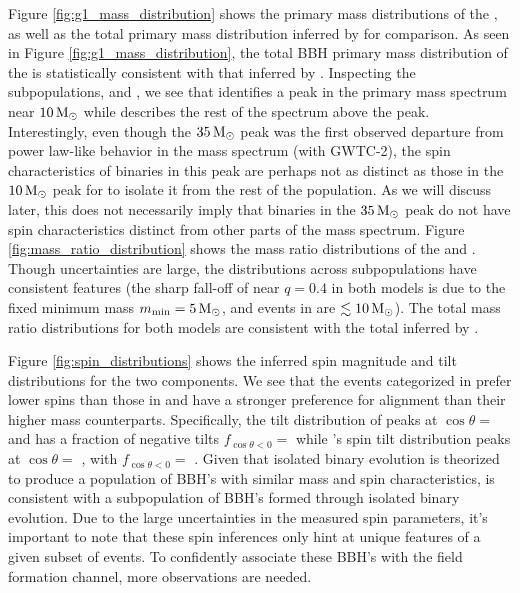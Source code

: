 Figure \ref{fig:g1_mass_distribution} shows the primary mass distributions of the \base{}, as well as the total primary mass distribution inferred by \brucepaper{} for comparison. As seen in Figure \ref{fig:g1_mass_distribution}, the total BBH primary mass distribution of the \base{} is statistically consistent with that inferred by \brucepaper{}. Inspecting the subpopulations, \first{} and \contB{}, we see that \first{} identifies a peak in the primary mass spectrum near $10{\,\rm M}_\odot$ while \contB{} describes the rest of the spectrum above the peak. Interestingly, even though the $35{\,\rm M}_\odot$ peak was the first observed departure from power law-like behavior in the mass spectrum (with GWTC-2), the spin characteristics of binaries in this peak are perhaps not as distinct as those in the $10{\,\rm M}_\odot$ peak for \first{} to isolate it from the rest of the population. As we will discuss later, this does not necessarily imply that binaries in the $35{\,\rm M}_\odot$ peak do not have spin characteristics distinct from other parts of the mass spectrum. Figure \ref{fig:mass_ratio_distribution} shows the mass ratio distributions of the \base{} and \comp{}. Though uncertainties are large, the distributions across subpopulations have consistent features (the sharp fall-off of \first{} near $q=0.4$ in both models is due to the fixed minimum mass $m_\text{min}=5{\,\rm M}_\odot$, and events in \first{} are $\lesssim10{\,\rm M}_\odot$). The total mass ratio distributions for both models are consistent with the total inferred by \brucepaper.

Figure \ref{fig:spin_distributions} shows the inferred spin magnitude and tilt distributions for the two components. We see that the events categorized in \popA{} prefer lower spins than those in \popB{} and have a stronger preference for alignment than their higher mass counterparts. Specifically, the tilt distribution of \popA{} peaks at $\cos{\theta}=$ \result{$\CIPlusMinus{\macros[CosTilt][Base][PeakA][max]}$} and has a fraction of negative tilts $f_{\cos{\theta} < 0} = $ \result{$\CIPlusMinus{\macros[CosTilt][Base][PeakA][negfrac]}$} while \popB{}'s spin tilt distribution peaks at $\cos{\theta}=$ \result{$\CIPlusMinus{\macros[CosTilt][Base][ContinuumB][max]}$}, with $f_{\cos{\theta} < 0} = $ \result{$\CIPlusMinus{\macros[CosTilt][Base][ContinuumB][negfrac]}$}. Given that isolated binary evolution is theorized to produce a population of BBH's with similar mass and spin characteristics, \first{} is consistent with a subpopulation of BBH's formed through isolated binary evolution. Due to the large uncertainties in the measured spin parameters, it's important to note that these spin inferences only hint at unique features of a given subset of events. To confidently associate these BBH's with the field formation channel, more observations are needed.

